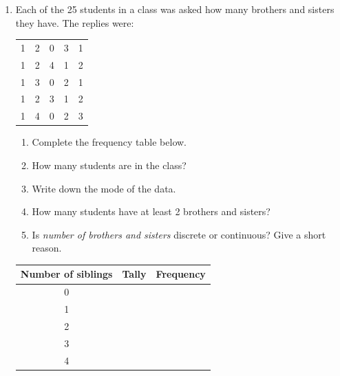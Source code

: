 \documentclass[12pt, twoside]{article}
\begin{document}
\begin{enumerate}[itemsep=0.15cm]

\newpage

\item[2.]

Each of the 25 students in a class was asked how many brothers and
sisters they have. The replies were:

\begin{center}
\begin{tabular}{ccccc}
1 & 2 & 0 & 3 & 1 \\
1 & 2 & 4 & 1 & 2 \\
1 & 3 & 0 & 2 & 1 \\
1 & 2 & 3 & 1 & 2 \\
1 & 4 & 0 & 2 & 3 \\
\end{tabular}
\end{center}

\begin{enumerate}[itemsep=0.05cm]
  \item Complete the frequency table below.
  \item How many students are in the class?
  \item Write down the mode of the data.
  \item How many students have at least 2 brothers and sisters?
  \item Is \emph{number of brothers and sisters} discrete or continuous?
  Give a short reason.
\end{enumerate}

{\renewcommand{\arraystretch}{2.0}
\begin{center}
\begin{tabular}{|c|p{6cm}|c|}
\hline
\textbf{Number of siblings} & \hfil \textbf{Tally} & \textbf{Frequency} \\ \hline
0 & & \\ \hline
1 & & \\ \hline
2 & & \\ \hline
3 & & \\ \hline
4 & & \\ \hline
\end{tabular}
\end{center}}


\end{enumerate}
\end{document}

